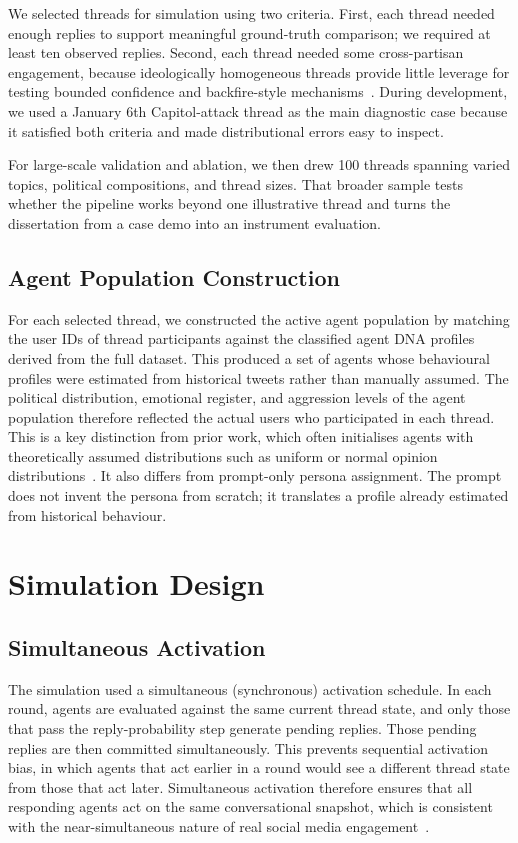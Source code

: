 \documentclass[logo,bsc,singlespacing,parskip,online]{infthesis}
\begin{document}
We selected threads for simulation using two criteria. First, each thread needed enough replies to support meaningful ground-truth comparison; we required at least ten observed replies. Second, each thread needed some cross-partisan engagement, because ideologically homogeneous threads provide little leverage for testing bounded confidence and backfire-style mechanisms~\citep{diehl2016political,composta2025simulating,cetinkaya2025crosspartisan}. During development, we used a January 6th Capitol-attack thread as the main diagnostic case because it satisfied both criteria and made distributional errors easy to inspect.

For large-scale validation and ablation, we then drew 100 threads spanning varied topics, political compositions, and thread sizes. That broader sample tests whether the pipeline works beyond one illustrative thread and turns the dissertation from a case demo into an instrument evaluation.

\subsection{Agent Population Construction}

For each selected thread, we constructed the active agent population by matching the user IDs of thread participants against the classified agent DNA profiles derived from the full dataset. This produced a set of agents whose behavioural profiles were estimated from historical tweets rather than manually assumed. The political distribution, emotional register, and aggression levels of the agent population therefore reflected the actual users who participated in each thread. This is a key distinction from prior work, which often initialises agents with theoretically assumed distributions such as uniform or normal opinion distributions~\citep{composta2025simulating}. It also differs from prompt-only persona assignment. The prompt does not invent the persona from scratch; it translates a profile already estimated from historical behaviour.

\section{Simulation Design}

\subsection{Simultaneous Activation}

The simulation used a simultaneous (synchronous) activation schedule. In each round, agents are evaluated against the same current thread state, and only those that pass the reply-probability step generate pending replies. Those pending replies are then committed simultaneously. This prevents sequential activation bias, in which agents that act earlier in a round would see a different thread state from those that act later. Simultaneous activation therefore ensures that all responding agents act on the same conversational snapshot, which is consistent with the near-simultaneous nature of real social media engagement~\citep{butler2024misinformation}.
\end{document}
